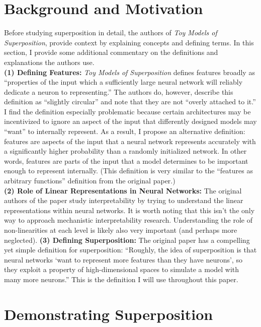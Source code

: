 \documentclass{article} %
\begin{document}
\section{Background and Motivation}

Before studying superposition in detail, the authors of  \textit{Toy Models of Superposition}, 
provide context by explaining concepts and defining terms. In this section, I 
provide some additional commentary on the definitions and explanations the authors use. \\

\textbf{(1) Defining Features: }\textit{Toy Models of Superposition}
defines features broadly as ``properties of the input which a sufficiently large 
neural network will reliably dedicate a neuron to representing.'' The authors do,
however, describe this definition as ``slightly circular'' and note that they are
not ``overly attached to it.'' I find the definition especially problematic because 
certain architectures may be incentivized to ignore an aspect of the input that 
differently designed models may ``want'' to internally represent. As a result, I propose an alternative definition: features are aspects 
of the input that a neural network represents accurately with a significantly higher probability than 
a randomly initialized network. In other words, features are parts of the input 
that a model determines to be important enough to represent internally. (This definition
is very similar to the ``features as arbitrary functions'' definition from the
original paper.)\\

\textbf{(2) Role of Linear Representations in Neural Networks: }The original authors
of the paper study interpretability by trying to understand the linear representations
within neural networks. It is worth noting that this isn't the only way to approach
mechanistic interpretability research. Understanding the role of non-linearities 
at each level is likely also very important (and perhaps more neglected).\newline\newline
\textbf{(3) Defining Superposition: } The original paper has a compelling yet
simple definition for superposition: ``Roughly, the idea of 
superposition is that neural networks `want to represent more features than they 
have neurons', so they exploit a property of high-dimensional spaces to 
simulate a model with many more neurons.'' This is the definition I will use
throughout this paper.

\section{Demonstrating Superposition}
\end{document}
